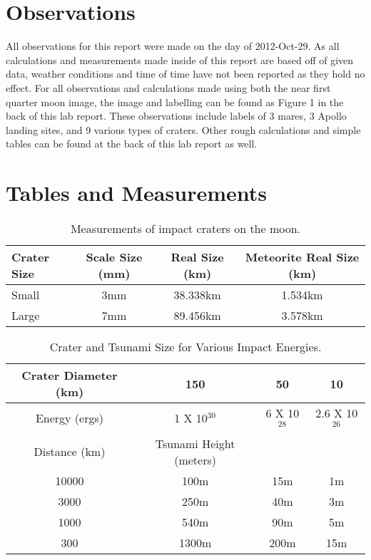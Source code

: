 \documentclass{article}
\begin{document}
\section{Observations}

All observations for this report were made on the day of 2012-Oct-29. As all calculations and measurements made inside of this report are based off of
given data, weather conditions and time of time have not been reported as they hold no effect. For all observations and
calculations made using both the near first quarter moon image, the image and labelling
can be found as Figure 1 in the back of this lab report. These observations include labels of 3 mares, 3 Apollo landing sites, and 9 various types of craters.
Other rough calculations and simple tables can be found at the back
of this lab report as well.


\section{Tables and Measurements}
\label{sec:tnm}

\begin{table}[h]
\begin{center}
\begin{tabular}{l c c c}
\hline
Crater Size & Scale Size (mm) & Real Size (km) & Meteorite Real Size (km)\\
\hline
\hline
Small & 3mm & 38.338km & 1.534km\\
Large & 7mm & 89.456km & 3.578km\\
\hline
\end{tabular}
\end{center}
\caption{Measurements of impact craters on the moon.\label{tab:craters}}
\end{table}

\begin{table}[h!]
\begin{center}
\begin{tabular}{c c c c}
\hline
\hline
Crater Diameter (km) & 150 & 50 & 10\\
\hline
Energy (ergs) & 1 X 10$^{30}$ & 6 X 10$^{28}$ & 2.6 X 10$^{26}$\\
\hline
\hline
Distance (km) & Tsunami Height (meters) &  & \\
10000 & 100m & 15m & 1m\\
3000 & 250m & 40m & 3m\\
1000 & 540m & 90m & 5m\\
300 & 1300m & 200m & 15m\\
\hline
\end{tabular}
\end{center}
\caption{Crater and Tsunami Size for Various Impact Energies.\label{tab:waves}}
\end{table}
\end{document}
